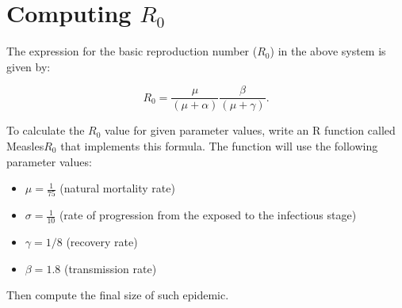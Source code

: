 \documentclass{article}
\begin{document}
\section{Computing $R_0$}
The expression for the basic reproduction number ($R_0$) in the above system  is given by:

\begin{equation*} R_0 = \frac{\mu}{(\mu + \alpha)} \frac{\beta}{(\mu + \gamma)}. \end{equation*}

To calculate the $R_0$ value for given parameter values,  write an R function 
called Measles$R_0$ that implements this formula. The function will use the following parameter values:

    \begin{itemize}
        \item $\mu = \frac{1}{75}$ (natural mortality rate)
        \item $\sigma = \frac{1}{10}$ (rate of progression from the exposed to the infectious stage)
        \item $\gamma = 1/8$ (recovery rate)
        \item $\beta = 1.8$ (transmission rate)
    \end{itemize}
Then compute the final size of such epidemic.
\end{document}
